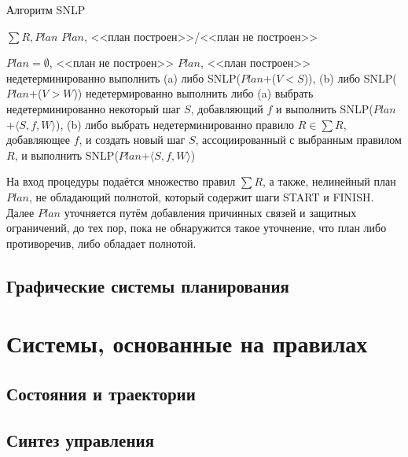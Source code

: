 \documentclass[b5paper,11pt]{book}
\numberwithin{Def}{section}
\numberwithin{Th}{chapter}
\numberwithin{St}{chapter}
\begin{document}
	\begin{algorithm}[h]
		\caption{Алгоритм SNLP}\label{alg:snlp}
		\begin{algorithmic}[1]
			\Require $\sum R, Plan$
			\Ensure $Plan$, <<план построен>>/<<план не построен>>
			
				\State \Return $Plan=\emptyset$, <<план не построен>>
			\EndIf
				\State \Return $Plan$, <<план построен>>
			\EndIf
				\State недетерминированно выполнить	
				\Statex (a) либо SNLP($Plan$+($V<S$)), 
				\Statex (b) либо SNLP($Plan$+($V>W$))
			\EndIf
				\State недетермированно выполнить либо 
				\Statex (a) выбрать недетерминированно некоторый шаг $S$, добавляющий $f$ и выполнить SNLP($Plan$+$\langle S,f,W\rangle$),
				\Statex (b) либо выбрать недетерминированно правило $R\in\sum R$, добавляющее $f$, и создать новый шаг $S$, ассоциированный с выбранным правилом $R$, и выполнить SNLP($Plan$+$\langle S,f,W\rangle$)
			\EndIf
		\end{algorithmic}
	\end{algorithm}
	
	На вход процедуры подаётся множество правил $\sum R$, а также, нелинейный план $Plan$, не обладающий полнотой, который содержит шаги START и FINISH. Далее $Plan$ уточняется путём добавления причинных связей и защитных ограничений, до тех пор, пока не обнаружится такое уточнение, что план либо противоречив, либо обладает полнотой.
	
	\section{Графические системы планирования}
		
		
	
	\chapter{Системы, основанные на правилах}
	
	\section{Состояния и траектории}
	\section{Синтез управления}
\end{document}
